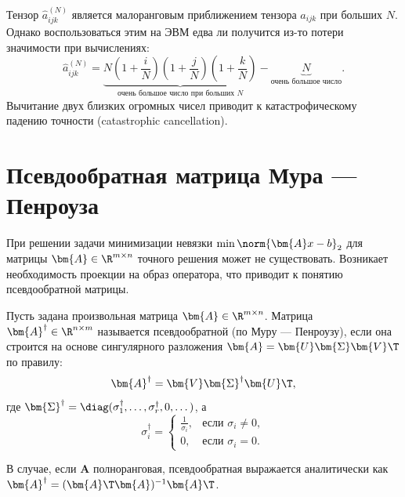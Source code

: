 \begin{tcbwarning}
    Тензор $\hat{a}_{ijk}^{(N)}$ является малоранговым приближением тензора $a_{ijk}$ при больших $N$. Однако воспользоваться этим на ЭВМ едва ли получится из-то потери значимости при вычислениях:
    \[
        \hat{a}_{ijk}^{(N)} = \underbrace{N \left(1 + \frac{i}{N}\right)\left(1 + \frac{j}{N}\right)\left(1 + \frac{k}{N}\right)}_{\text{очень большое число при больших } N} - \underbrace{N}_{\text{очень большое число}}.
    \]
    Вычитание двух близких огромных чисел приводит к катастрофическому падению точности (catastrophic cancellation).
\end{tcbwarning}

\section{Псевдообратная матрица Мура — Пенроуза}
\label{sec:pseudo-inverse}

При решении задачи минимизации невязки $\min \norm{\bm{A}x - b}_2$ для матрицы $\bm{A} \in \R^{m \times n}$ точного решения может не существовать. Возникает необходимость проекции на образ оператора, что приводит к понятию псевдообратной матрицы.

\begin{tcbdefinition}
\label{def:pseudo-inverse}
    Пусть задана произвольная матрица $\bm{A} \in \R^{m \times n}$. Матрица $\bm{A}^\dagger \in \R^{n \times m}$ называется псевдообратной (по Муру — Пенроузу), если она строится на основе сингулярного разложения $\bm{A} = \bm{U}\bm{\Sigma}\bm{V}\T$ по правилу:
    \[
        \bm{A}^\dagger = \bm{V} \bm{\Sigma}^\dagger \bm{U}\T,
    \]
    где $\bm{\Sigma}^\dagger = \diag(\sigma_1^\dagger, \dots, \sigma_r^\dagger, 0, \dots)$, а
    \[
        \sigma_i^\dagger = 
        \begin{cases}
            \frac{1}{\sigma_i}, & \text{если } \sigma_i \neq 0, \\
            0, & \text{если } \sigma_i = 0.
        \end{cases}
    \]
\end{tcbdefinition}

В случае, если $\bm{A}$ полноранговая, псевдообратная выражается аналитически как $\bm{A}^\dagger = (\bm{A}\T \bm{A})^{-1} \bm{A}\T$.

